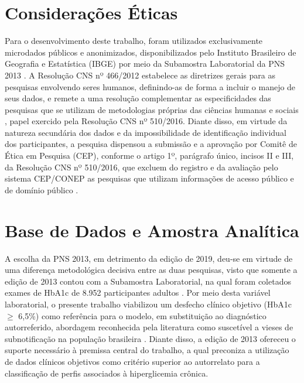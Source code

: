 \section{Considerações Éticas}

Para o desenvolvimento deste trabalho, foram utilizados exclusivamente microdados públicos e anonimizados, disponibilizados pelo Instituto Brasileiro de Geografia e Estatística (IBGE) por meio da Subamostra Laboratorial da PNS 2013 \cite{IBGE_PNS2013_Exames}. A Resolução CNS nº 466/2012 estabelece as diretrizes gerais para as pesquisas envolvendo seres humanos, definindo-as de forma a incluir o manejo de seus dados, e remete a uma resolução complementar as especificidades das pesquisas que se utilizam de metodologias próprias das ciências humanas e sociais \cite{brasil2012resolucao466}, papel exercido pela Resolução CNS nº 510/2016. Diante disso, em virtude da natureza secundária dos dados e da impossibilidade de identificação individual dos participantes, a pesquisa dispensou a submissão e a aprovação por Comitê de Ética em Pesquisa (CEP), conforme o artigo 1º, parágrafo único, incisos II e III, da Resolução CNS nº 510/2016, que excluem do registro e da avaliação pelo sistema CEP/CONEP as pesquisas que utilizam informações de acesso público e de domínio público \cite{cns2016resolucao510}.
\section{Base de Dados e Amostra Analítica}\label{sec:base-dados}

A escolha da PNS 2013, em detrimento da edição de 2019, deu-se em virtude de uma diferença metodológica decisiva entre as duas pesquisas, visto que somente a edição de 2013 contou com a Subamostra Laboratorial, na qual foram coletados exames de HbA1c de 8.952 participantes adultos \cite{IBGE_PNS2013_Exames}. Por meio desta variável laboratorial, o presente trabalho viabilizou um desfecho clínico objetivo (HbA1c $\geq$ 6,5\%) como referência para o modelo, em substituição ao diagnóstico autorreferido, abordagem reconhecida pela literatura como suscetível a vieses de subnotificação na população brasileira \cite{muzy2021prevalencia,reis2022evolution,deAlmeida-Pititto09112015}. Diante disso, a edição de 2013 ofereceu o suporte necessário à premissa central do trabalho, a qual preconiza a utilização de dados clínicos objetivos como critério superior ao autorrelato para a classificação de perfis associados à hiperglicemia crônica.

